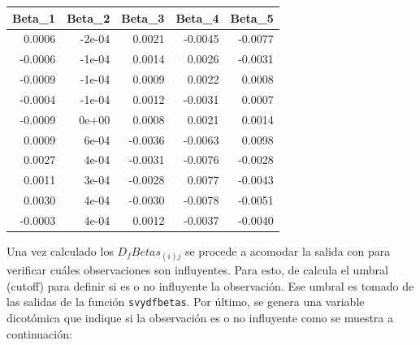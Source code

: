 \documentclass[
  12pt,
]{book}
\newenvironment{Shaded}{\begin{snugshade}}{\end{snugshade}}
\newcommand{\AttributeTok}[1]{\textcolor[rgb]{0.77,0.63,0.00}{#1}}
\newcommand{\DecValTok}[1]{\textcolor[rgb]{0.00,0.00,0.81}{#1}}
\newcommand{\FunctionTok}[1]{\textcolor[rgb]{0.00,0.00,0.00}{#1}}
\newcommand{\NormalTok}[1]{#1}
\newcommand{\OtherTok}[1]{\textcolor[rgb]{0.56,0.35,0.01}{#1}}
\newcommand{\SpecialCharTok}[1]{\textcolor[rgb]{0.00,0.00,0.00}{#1}}
\newcommand{\StringTok}[1]{\textcolor[rgb]{0.31,0.60,0.02}{#1}}
\begin{document}
\begin{tabular}{r|r|r|r|r}
\hline
Beta\_1 & Beta\_2 & Beta\_3 & Beta\_4 & Beta\_5\\
\hline
0.0006 & -2e-04 & 0.0021 & -0.0045 & -0.0077\\
\hline
-0.0006 & -1e-04 & 0.0014 & 0.0026 & -0.0031\\
\hline
-0.0009 & -1e-04 & 0.0009 & 0.0022 & 0.0008\\
\hline
-0.0004 & -1e-04 & 0.0012 & -0.0031 & 0.0007\\
\hline
-0.0009 & 0e+00 & 0.0008 & 0.0021 & 0.0014\\
\hline
0.0009 & 6e-04 & -0.0036 & -0.0063 & 0.0098\\
\hline
0.0027 & 4e-04 & -0.0031 & -0.0076 & -0.0028\\
\hline
0.0011 & 3e-04 & -0.0028 & 0.0077 & -0.0043\\
\hline
0.0030 & 4e-04 & -0.0030 & -0.0078 & -0.0051\\
\hline
-0.0003 & 4e-04 & 0.0012 & -0.0037 & -0.0040\\
\hline
\end{tabular}

Una vez calculado los \(D_{f}Betas_{\left(i\right)j}\) se procede a acomodar la salida con para verificar cuáles observaciones son influyentes. Para esto, de calcula el umbral (cutoff) para definir si es o no influyente la observación. Ese umbral es tomado de las salidas de la función \texttt{svydfbetas}. Por último, se genera una variable dicotómica que indique si la observación es o no influyente como se muestra a continuación:

\begin{Shaded}
\end{Shaded}
\end{document}
